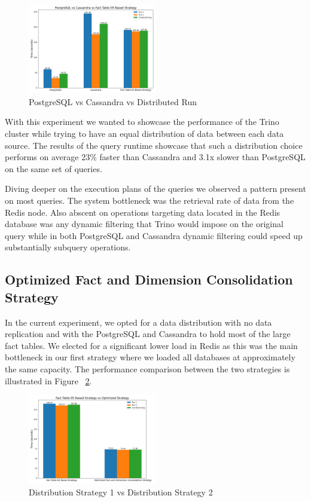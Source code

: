 \documentclass[conference]{IEEEtran}
\begin{document}
\begin{figure}[h]
	\centering
	\includegraphics[width=0.5\textwidth]{images/No_distro_vs_dist1/no_dist_vs_dist1.png}
	\caption{PostgreSQL vs Cassandra vs Distributed Run}
	\label{fig:psql-cass-distro}
\end{figure}

With this experiment we wanted to showcase the performance of the Trino cluster while trying to have an equal distribution of data between each data source. The results of the query runtime showcase that such a distribution choice performs on average 23\% faster than Cassandra and 3.1x slower than PostgreSQL on the same set of queries.

Diving deeper on the execution plans of the queries we observed a pattern present on most queries. The system bottleneck was the retrieval rate of data from the Redis node. Also abscent on operations targeting data located in the Redis database was any dynamic filtering that Trino would impose on the original query while in both PostgreSQL and Cassandra dynamic filtering could speed up substantially subquery operations.


\subsection{Optimized Fact and Dimension Consolidation Strategy}
\label{sec:optimized-fact-dimension-consolidation-strategy}

In the current experiment, we opted for a data distribution with no data replication and with the PostgreSQL and Cassandra to hold most of the large fact tables. We elected for a significant lower load in Redis as this was the main bottleneck in our first strategy where we loaded all databases at approximately the same capacity. The performance comparison between the two strategies is illustrated in Figure ~\ref{fig:distro1-distro2}.

\begin{figure}[h]
	\centering
	\includegraphics[width=0.5\textwidth]{images/dist1_vs_dist2/dist1_vs_dist2.png}
	\caption{Distribution Strategy 1 vs Distribution Strategy 2}
	\label{fig:distro1-distro2}
\end{figure}
\end{document}
